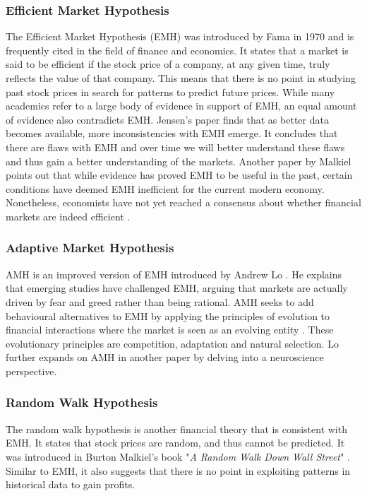 \documentclass{UoYCSproject}
\begin{document}
\subsubsection{Efficient Market Hypothesis}
The Efficient Market Hypothesis (EMH) was introduced by Fama in 1970  \cite{malkiel1970efficient} and is frequently cited in the field of finance and economics. It states that a market is said to be efficient if the stock price of a company, at any given time, truly reflects the value of that company. This means that there is no point in studying past stock prices in search for patterns to predict future prices. While many academics refer to a large body of evidence in support of EMH, an equal amount of evidence also contradicts EMH. Jensen's \cite{jensen1978some} paper finds that as better data becomes available, more inconsistencies with EMH emerge. It concludes that there are flaws with EMH and over time we will better understand these flaws and thus gain a better understanding of the markets. Another paper by Malkiel \cite{malkiel2003efficient} points out that while evidence has proved EMH to be useful in the past, certain conditions have deemed EMH inefficient for the current modern economy. Nonetheless, economists have not yet reached a consensus about whether financial markets are indeed efficient \cite{lo2004adaptive}.  

\subsubsection{Adaptive Market Hypothesis}
AMH is an improved version of EMH introduced by Andrew Lo \cite{lo2004adaptive}. He explains that emerging studies have challenged EMH, arguing that markets are actually driven by fear and greed rather than being rational. AMH seeks to add behavioural alternatives to EMH by applying the principles of evolution to financial interactions where the market is seen as an evolving entity \cite{lo2004adaptive}. These evolutionary principles are competition, adaptation and natural selection. Lo further expands on AMH in another paper \cite{lo2005reconciling}
by delving into a neuroscience perspective.

\subsubsection{Random Walk Hypothesis}
The random walk hypothesis is another financial theory that is consistent with EMH. It states that stock prices are random, and thus cannot be predicted. It was introduced in Burton Malkiel's book "\textit{A Random Walk Down Wall Street}" \cite{malkiel1973random}. Similar to EMH, it also suggests that there is no point in exploiting patterns in historical data to gain profits.  
\end{document}

